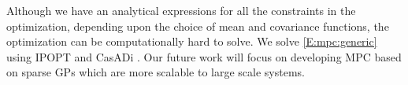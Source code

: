 Although we have an analytical expressions for all the constraints in the optimization, depending upon the choice of mean and covariance functions, the optimization can be computationally hard to solve.
We solve \eqref{E:mpc:generic} using IPOPT \cite{Waechter2009b} and CasADi \cite{Andersson2013b}.
Our future work will focus on developing MPC based on sparse GPs which are more scalable to large scale systems.


